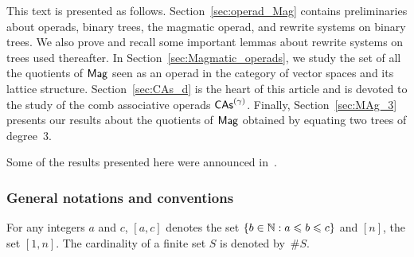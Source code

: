 This text is presented as follows. Section~\ref{sec:operad_Mag} contains
preliminaries about operads, binary trees, the magmatic operad, and
rewrite systems on binary trees. We also prove and recall some important
lemmas about rewrite systems on trees used thereafter. In
Section~\ref{sec:Magmatic_operads}, we study the set of all the
quotients of $\mathsf{Mag}$ seen as an operad in the category of vector spaces
and its lattice structure. Section~\ref{sec:CAs_d} is the heart of this
article and is devoted to the study of the comb associative operads
$\mathsf{CAs}^{\left(\gamma\right)}$. Finally, Section~\ref{sec:MAg_3} presents our results
about the quotients of $\mathsf{Mag}$ obtained by equating two trees of
degree~$3$.
\medbreak

Some of the results presented here were announced in~\cite{CCG18}.
\medbreak

\subsubsection*{General notations and conventions}
For any integers $a$ and $c$, $[a, c]$ denotes the set
$\{b \in \mathbb{N} : a \leqslant b \leqslant c\}$ and $[n]$, the set $[1, n]$. The
cardinality of a finite set $S$ is denoted by~$\# S$.
\medbreak
